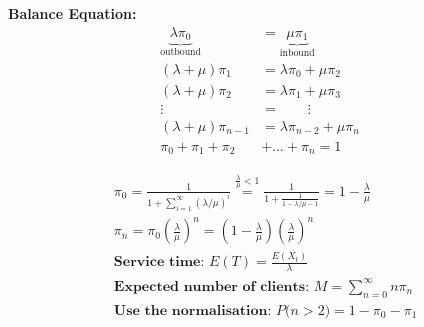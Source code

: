 \begin{minipage}{5.5cm}
	\textbf{Balance Equation:}
	\begin{align}
		\underbrace{\lambda\pi_0}_{\text{outbound}}			&=\underbrace{\mu\pi_1}_{\text{inbound}}						\nonumber\\[0.25cm]
		(\lambda+\mu)\pi_1		&=\lambda\pi_0+\mu\pi_2	\nonumber\\[0.25cm]
		(\lambda+\mu)\pi_2		&=\lambda\pi_1+\mu\pi_3	\nonumber\\[0.25cm]
		\vdots\qquad			&=\qquad\vdots							\nonumber\\[0.25cm]
		(\lambda+\mu)\pi_{n-1}	&=\lambda\pi_{n-2}+\mu\pi_{n}	\nonumber\\[0.25cm]
		\pi_0+\pi_1+\pi_2&+\ldots+\pi_n=1\nonumber
	\end{align}
\end{minipage}
\hfill
\begin{minipage}{13.5cm}
	\begin{align}
		&\pi_0=\frac{1}{1+\sum\limits_{i=1}^{\infty}{\left(\lambda/\mu\right)^i}}\overset{\frac{\lambda}{\mu}<1}{=}\frac{1}{1+\frac{1}{1-\lambda/\mu-1}}=1-\frac\lambda\mu\nonumber\\[0.25cm]
		&\pi_n=\pi_0\left(\frac{\lambda}{\mu}\right)^n=\left(1-\frac{\lambda}{\mu}\right)\left(\frac\lambda\mu\right)^n\nonumber\\[0.5cm]
		&\textbf{Service time: }E(T)=\frac{E(X_t)}{\lambda}\nonumber\\ %
		&\textbf{Expected number of clients: }M=\sum\limits_{n=0}^{\infty}{n\pi_n}\nonumber\\
		&\textbf{Use the normalisation: } P\big(n>2\big)=1-\pi_0-\pi_1\nonumber
	\end{align}
\end{minipage}

\vfill



 

